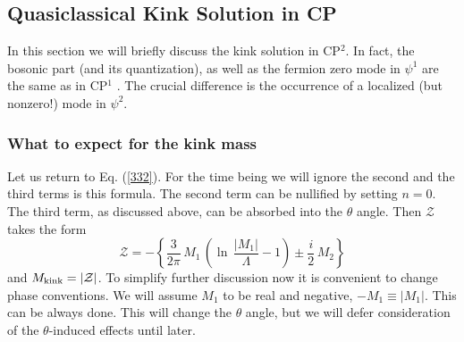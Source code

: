 \documentclass[epsfig,12pt]{article}
\def\beq{\begin{equation}}
\def\eeq{\end{equation}}
\def\beq{\begin{equation}}
\def\eeq{\end{equation}}
\newcommand{\mc}[1]{\mathcal{#1}}
\begin{document}





\subsection{Quasiclassical Kink Solution in CP}
\setcounter{equation}{0}
\label{kinksolu}

	In this section we will briefly discuss the kink solution in CP$^2$. 
	In fact, the bosonic part (and its quantization), 
	as well as the fermion zero mode in $\psi^1$ are the same as in CP$^1$ \cite{Shifman:2007ce}. 
	The crucial difference is the occurrence of a localized (but nonzero!) mode in $\psi^2$.



\subsubsection{What to expect for the kink mass}

Let us return to Eq. (\ref{332}). For the time being we will ignore the second and the third terms is this formula.
The second term can be nullified by setting $n=0$. The third term, as discussed above,
can be absorbed into the $\theta$ angle. Then $\mc{Z} $ takes the form 
\beq
\mc{Z} = -\left\{  \frac{3}{2\pi}\, M_1\, \left(  \ln\, \frac {   |M_1|   }
                                                 {  \Lambda  } -1 \right) 
                                                 \pm
                                                 \frac{i}{2}\, M_2
                                                 \right\} 
                                                 \label{41}
\eeq
and $M_{\rm kink} = |\mc{Z}|$. To simplify further discussion now it is convenient  to change phase conventions.
We will assume $M_1$ to be real and negative, $-M_1\equiv |M_1|$. This can be always done. This will change the $\theta$ angle, but we will 
defer consideration of  the $\theta$-induced effects until later.
\end{document}
